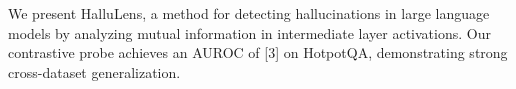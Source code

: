 
We present HalluLens, a method for detecting hallucinations in large language
models by analyzing mutual information in intermediate layer activations.
Our contrastive probe achieves an AUROC of
[3]
on HotpotQA, demonstrating strong cross-dataset generalization.
